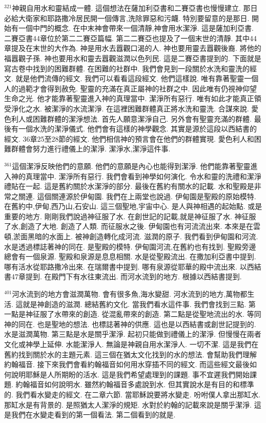 \documentclass{book}
\begin{document}
$^{321}$神親自用水和靈結成一體.
這個想法在薩加利亞書和二賽亞書也慢慢建立.
那日必給大衛家和耶路撒冷居民開一個傳言,洗除罪惡和污衊.
特別要留意的是那日.
開始有一個中門的概念.
在中末神會帶來一個清靜,神會用水潔淨.
這是薩加利亞書.
二賽亞書44章位於第二二賽亞篇幅.
第二二賽亞也提及了一個末世的清靜.
其中44章提及在末世的大作為.
神是用水去囂觀口渴的人.
神也要用靈去囂觀後裔.
將他的福囂觀子孫.
神也要用水和靈去囂觀滋潤以色列民.
這是二賽亞書提到的.
下面就是寫古卷中找到的困難群體.
在困難的社群中.
我們會見到一段關於水洗和靈洗的經文.
就是他們流傳的經文.
我們可以看看這段經文.
他們這樣說.
唯有靠著聖靈一個人的過範才會得到赦免.
聖靈的充滿在真正屬神的社群之中.
因此唯有仍視神仰望生命之光.
他才能靠著聖靈進入神的真理當中.
潔淨所有惡行.
唯有如此才能真正領受淨化之水.
被潔淨的水流潔淨.
在這裡困難群體真正將水洗和靈洗.
合謀來說.
愛色利人或困難群體的潔淨想法.
首先人願意潔淨自己.
另外會有聖靈充滿的群體.
最後有一個水洗的潔淨儀式.
他們會有這樣的神學觀念.
其實是源於這段以西結書的經文.
36章25至28節的經文.
他們相信神的預言會在他們的群體實現.
愛色利人和困難群體會努力進行禮儀上的潔淨.
潔淨水,潔淨這件事.

$^{361}$這個潔淨反映他們的意願.
他們的意願是內心也能得到潔淨.
他們能靠著聖靈進入神的真理當中.
潔淨所有惡行.
我們會看到神學如何演化.
令水和靈的洗禮和潔淨禮貼在一起.
這是舊約關於水潔淨的部分.
最後在舊約有關水的記載.
水和聖殿是非常之關連.
這個關連源於伊甸園.
我們在上兩堂也說過.
伊甸園是聖殿的原始模特.
在舊約中,伊甸,西乃山,石安山.
這三個聖地,宇宙中心.
是人與神相遇的起始點.
或是重要的地方.
剛剛我們說過神征服了水.
在創世記的記載,就是神征服了水.
神征服了水,創造了大地.
創造了人類.
而征服水之後.
伊甸園也有河流流出來.
本來是在雲頓,淤面黑暗的水面上.
被神創造轉化成河流.
滋潤的原子.
我們看到伊甸園和河流.
水是透過標誌著神的同在.
是聖殿的模特.
伊甸園河流,在舊約也有找到.
聖殿旁邊總會有一個泉源.
聖殿和泉源是息息相關.
水是從聖殿流出.
在撒加利亞書中提到.
哪有活水從耶路撒冷出來.
在瑞爾書中提到.
哪有泉源從耶華的殿中流出來.
以西結書47章提到.
在殿門下有水往東流出.
而河水流到的地方.
根據以西結書提到.

$^{401}$河水流到的地方會滋潤萬物.
會有很多魚,海水變甜.
河水流到的地方,萬物都生活.
這就是神創造的滋潤.
總結舊約文化.
當我們看水這件事.
我們會找到三點.
第一點是神征服了水帶來的創造.
從混亂帶來的創造.
第二點是從聖地流出的水.
等同神的同在.
也是聖地的想法.
也標誌著神的供應.
這也是以西結書或創世記提到的.
水是滋潤萬物.
第三點是水是關乎潔淨.
起初只能做到禮儀上的潔淨.
但慢慢在兩者文化或神學上延伸.
水能潔淨人.
無論是神親自用水潔淨人.
一切不潔.
這是我們在舊約找到關於水的主題元素.
這三個在猶太文化找到的水的想法.
會幫助我們理解約翰福音.
接下來我們會看約翰福音如何用水穿插不同的經文.
而這些經文最後如何說明耶穌是人所期盼的活水.
這是我們希望處理到的課題.
事不宜遲我們開始課題.
約翰福音如何說明水.
雖然約翰福音多處說到水.
但其實說水是有目的和標準的.
我們看水變走的經文.
在二章六節.
當耶穌說要將水變走.
吩咐僕人拿出那缸水.
那缸水是有背景的.
是照猶太人潔淨的規矩.
水對於約翰的記載來說是關乎潔淨.
這是我們在水變走看到的第一個看法.
第二個看到的就是.
\end{document}
